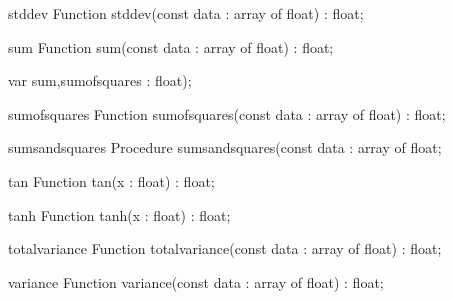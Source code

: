 \FPCexample{}


\begin{function}{stddev}
\Declaration
Function stddev(const data : array of float) : float;
\Description

\Errors
\SeeAlso
\end{function}

\FPCexample{}


\begin{function}{sum}
\Declaration
Function sum(const data : array of float) : float;
\Description

\Errors
\SeeAlso
\end{function}

\FPCexample{}


  var sum,sumofsquares : float);
\begin{function}{sumofsquares}
\Declaration
Function sumofsquares(const data : array of float) : float;
\Description

\Errors
\SeeAlso
\end{function}

\FPCexample{}


\begin{procedure}{sumsandsquares}
\Declaration
Procedure sumsandsquares(const data : array of float;
\Description

\Errors
\SeeAlso
\end{procedure}

\FPCexample{}


\begin{function}{tan}
\Declaration
Function tan(x : float) : float;
\Description

\Errors
\SeeAlso
\end{function}

\FPCexample{}


\begin{function}{tanh}
\Declaration
Function tanh(x : float) : float;
\Description

\Errors
\SeeAlso
\end{function}

\FPCexample{}


\begin{function}{totalvariance}
\Declaration
Function totalvariance(const data : array of float) : float;
\Description

\Errors
\SeeAlso
\end{function}

\FPCexample{}


\begin{function}{variance}
\Declaration
Function variance(const data : array of float) : float;
\Description

\Errors
\SeeAlso
\end{function}

\FPCexample{}


